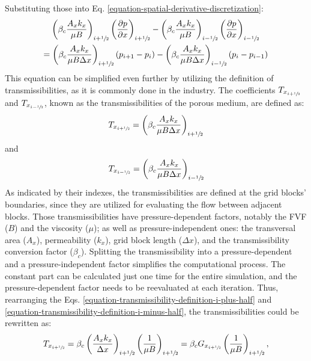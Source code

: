 %
Substituting those into Eq. \ref{equation-spatial-derivative-discretization}:
%
\begin{multline}
	\label{equation-spatial-derivative-discretization-rearranged}
	\left( \beta_c \frac{A_x k_x}{\mu B}\right)_{i+\sfrac{1}{2}} \left(\frac{\partial p}{\partial x}\right)_{i+\sfrac{1}{2}} - \left( \beta_c \frac{A_x k_x}{\mu B}\right)_{i-\sfrac{1}{2}} \left(\frac{\partial p}{\partial x}\right)_{i-\sfrac{1}{2}}\\ = \left( \beta_c \frac{A_x k_x}{\mu B \Delta x}\right)_{i+\sfrac{1}{2}} (p_{i+1}-p_i) - \left( \beta_c \frac{A_x k_x}{\mu B \Delta x}\right)_{i-\sfrac{1}{2}} (p_i-p_{i-1})
\end{multline}
%
This equation can be simplified even further by utilizing the definition of transmissibilities, as it is commonly done in the industry.
%
The coefficients $T_{x_{i+\sfrac{1}{2}}}$ and $T_{x_{i-\sfrac{1}{2}}}$, known as the transmissibilities of the porous medium, are defined as:
%
%
\begin{align}
	\label{equation-transmissibility-definition-i-plus-half}
	T_{x_{i+\sfrac{1}{2}}}=\left( \beta_c \frac{A_x k_x}{\mu B \Delta x}\right)_{i+\sfrac{1}{2}}
\end{align}
%
and
%
\begin{align}
	\label{equation-transmissibility-definition-i-minus-half}
	T_{x_{i-\sfrac{1}{2}}}=\left( \beta_c \frac{A_x k_x}{\mu B \Delta x}\right)_{i-\sfrac{1}{2}}
\end{align}
%
\noindent
As indicated by their indexes, the transmissibilities are defined at the grid blocks' boundaries, since they are utilized for evaluating the flow between adjacent blocks.
%
Those transmissibilities have pressure-dependent factors, notably the FVF ($B$) and the viscosity ($\mu$); as well as pressure-independent ones: the transversal area ($A_x$), permeability ($k_x$), grid block length ($\Delta x$), and the transmissibility conversion factor ($\beta_c$).
%
Splitting the transmissibility into a pressure-dependent and a pressure-independent factor simplifies the computational process. The constant part can be calculated just one time for the entire simulation, and the pressure-dependent factor needs to be reevaluated at each iteration.
%
Thus, rearranging the Eqs. \ref{equation-transmissibility-definition-i-plus-half} and \ref{equation-transmissibility-definition-i-minus-half}, the transmissibilities could be rewritten as:
%
\begin{align}
	\label{equation-transmissibility-splitted-i-plus-half}
	T_{x_{i+\sfrac{1}{2}}}=\beta_c\left(\frac{A_x k_x}{\Delta x}\right)_{i+\sfrac{1}{2}} \left(\frac{1}{\mu B}\right)_{i+\sfrac{1}{2}}=\beta_c G_{x_{i+\sfrac{1}{2}}} \left(\frac{1}{\mu B}\right)_{i+\sfrac{1}{2}} ,
\end{align}
